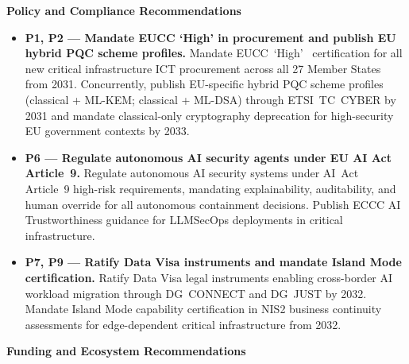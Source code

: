 \textbf{Policy and Compliance Recommendations}

\begin{itemize}

    \item \textbf{P1, P2 --- Mandate EUCC `High' in procurement and
    publish EU hybrid PQC scheme profiles.}
    Mandate EUCC~`High'~\cite{eucc} certification for all new critical
    infrastructure ICT procurement across all 27 Member States from
    2031. Concurrently, publish EU-specific hybrid PQC scheme profiles
    (classical + ML-KEM; classical + ML-DSA) through ETSI~TC~CYBER by
    2031 and mandate classical-only cryptography deprecation for
    high-security EU government contexts by 2033.

    \item \textbf{P6 --- Regulate autonomous AI security agents under
    EU AI Act Article~9.}
    Regulate autonomous AI security systems under
    AI~Act~\cite{aiact} Article~9 high-risk requirements, mandating
    explainability, auditability, and human override for all autonomous
    containment decisions. Publish ECCC AI Trustworthiness guidance
    for LLMSecOps deployments in critical infrastructure.

    \item \textbf{P7, P9 --- Ratify Data Visa instruments and mandate
    Island Mode certification.}
    Ratify Data Visa legal instruments enabling cross-border AI
    workload migration through DG~CONNECT and DG~JUST by 2032.
    Mandate Island Mode capability certification in NIS2 business
    continuity assessments for edge-dependent critical infrastructure
    from 2032.

\end{itemize}

\textbf{Funding and Ecosystem Recommendations}

